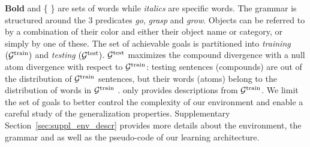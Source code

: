 \textbf{Bold} and \{ \} are sets of words while \textit{italics} are specific words. 
The grammar is structured around the $3$ predicates \textit{go}, \textit{grasp} and \textit{grow}. Objects can be referred to by a combination of their color and either their object name or category, or simply by one of these.
The set of achievable goals is partitioned into \textit{training} $(\mathcal{G}^{\text{train}})$ and \textit{testing}  $(\mathcal{G}^{\text{test}})$. $\mathcal{G}^{\text{test}}$ maximizes the compound divergence with a null atom divergence with respect to $\mathcal{G}^{\text{train}}$: testing sentences (compounds) are out of the distribution of $\mathcal{G}^{\text{train}}$ sentences, but their words (atoms) belong to the distribution of words in $\mathcal{G}^{\text{train}}$ \cite{keysers2019measuring}. \SP only provides descriptions from $\mathcal{G}^{\text{train}}$. We limit the set of goals to better control the complexity of our environment and enable a careful study of the generalization properties. Supplementary Section~\ref{sec:suppl_env_descr} provides more details about the environment, the grammar and \SP as well as the pseudo-code of our learning architecture.


